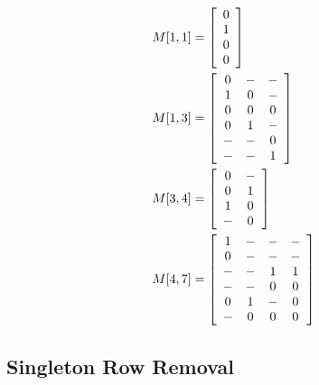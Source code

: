 \documentclass[10pt,twocolumn]{article}
\begin{document}
\begin{align*}
        M[1,1] &= \left[ \begin{array}{c}
                0                       \\ 
                1                       \\ 
                0                       \\ 
                0 
        \end{array} \right]             \\
        M[1,3] &= \left[ \begin{array}{c c c}
                0       & -     & -     \\
                1       & 0     & -     \\
                0       & 0     & 0     \\
                0       & 1     & -     \\
                -       & -     & 0     \\
                -       & -     & 1 
        \end{array} \right]             \\
        M[3,4] &= \left[ \begin{array}{c c}
                0       & -             \\
                0       & 1             \\
                1       & 0             \\
                -       & 0
        \end{array} \right]             \\
        M[4,7] &= \left[ \begin{array}{c c c c}
        1       & -     & -     & -     \\
        0       & -     & -     & -     \\
        -       & -     & 1     & 1     \\
        -       & -     & 0     & 0     \\
        0       & 1     & -     & 0     \\
        -       & 0     & 0     & 0     
        \end{array} \right]
\end{align*}

\subsection{Singleton Row Removal}
\end{document}

